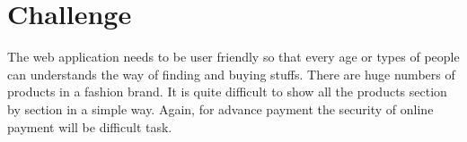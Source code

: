 \documentclass{article}
\begin{document}
\section{Challenge}
The web application needs to be user friendly so that every age or types of people can understands the way of finding and buying stuffs. There are huge numbers of products in a fashion brand. It is quite difficult to show all the products section by section in a simple way.  Again, for advance payment the security of online payment will be difficult task.
\end{document}
